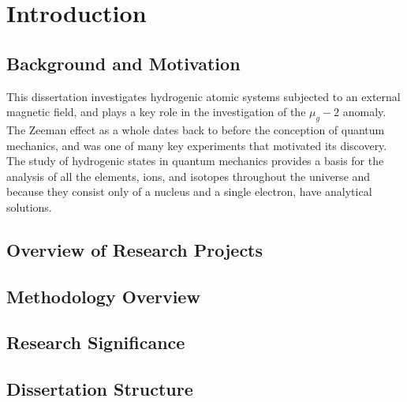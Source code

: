 \chapter{Introduction}
    \section{Background and Motivation}
        This dissertation investigates hydrogenic atomic systems subjected to an external magnetic field, and plays a key role in the investigation of the $\mu_g - 2$ anomaly. The Zeeman effect as a whole dates back to before the conception of quantum mechanics, and was one of many key experiments that motivated its discovery. The study of hydrogenic states in quantum mechanics provides a basis for the analysis of all the elements, ions, and isotopes throughout the universe and because they consist only of a nucleus and a single electron, have analytical solutions.
    \section{Overview of Research Projects}
    \section{Methodology Overview}
    \section{Research Significance}
    \section{Dissertation Structure}
